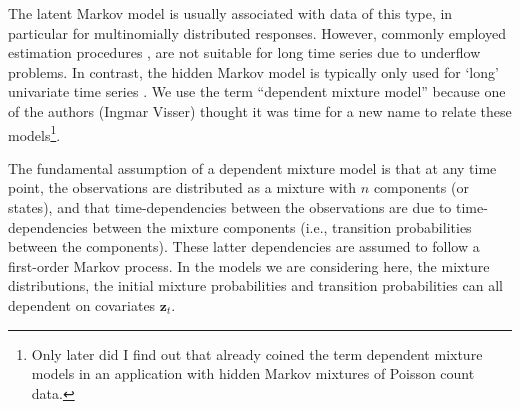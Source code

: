 \documentclass[article]{jss}
\newcommand{\vc}{\mathbf}
\newcommand{\greekv}[1]{\mbox{\boldmath$\mathrm{#1}$}}
\begin{document}
The latent Markov model is usually associated with data of this type,
in particular for multinomially distributed responses. %
However, commonly employed estimation procedures
\citep[e.g.,][]{Pol1996}, are not suitable for long time series due to
underflow problems. In contrast, the hidden Markov model is typically
only used for `long' univariate time series \citep[][chapter~1]{Cappe2005}. 
We use the term ``dependent mixture model'' because one of the authors 
(Ingmar Visser) thought it
was time for a new name to relate these models\footnote{Only later did I
find out that \citet{Leroux1992} already coined the term dependent
mixture models in an application with hidden Markov mixtures of
Poisson count data.}.

The fundamental assumption of a dependent mixture model is that at any time 
point, the observations are distributed as a mixture with $n$ components 
(or states), and that time-dependencies between the observations are due to 
time-dependencies between the mixture components (i.e., transition probabilities
between the components). These latter dependencies are assumed to
follow a first-order Markov process. In the models we are considering here, the 
mixture distributions, the initial mixture probabilities and transition 
probabilities can all dependent on covariates $\vc{z}_t$. 

\end{document}
